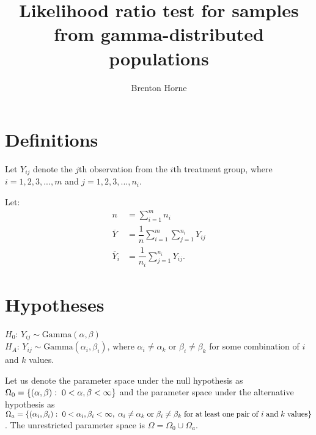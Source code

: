 \documentclass[12pt,a4paper,openright]{article}
\title{Likelihood ratio test for samples from gamma-distributed populations}
\author{Brenton Horne}
\newcommand{\GamD}{\mathrm{Gamma}}
\begin{document}
	\maketitle
	\tableofcontents
	\newpage
	
	\section{Definitions}
	Let $Y_{ij}$ denote the $j$th observation from the $i$th treatment group, where $i=1, 2, 3, ..., m$ and $j=1, 2, 3, ..., n_i$. 
	
	Let:
	\begin{align*}
		n &= \sum_{i=1}^m n_i \\
		\overline{Y} &= \dfrac{1}{n} \sum_{i=1}^m \sum_{j=1}^{n_i} Y_{ij} \\
		\overline{Y}_i &= \dfrac{1}{n_i} \sum_{j=1}^{n_i} Y_{ij}.
	\end{align*}
	
	\section{Hypotheses}
	$H_0$: $Y_{ij} \sim \GamD(\alpha, \beta)$ \\
	$H_A$: $Y_{ij} \sim \GamD(\alpha_i, \beta_i)$, where $\alpha_i \neq \alpha_k$ or $\beta_i \neq \beta_k$ for some combination of $i$ and $k$ values. 
	
	Let us denote the parameter space under the null hypothesis as $\Omega_0 = \left\{(\alpha, \beta): \hspace{0.1cm} 0 < \alpha, \beta < \infty\right\}$ and the parameter space under the alternative hypothesis as \\$\Omega_a = \left\{(\alpha_i, \beta_i): \hspace{0.1cm} 0 < \alpha_i, \beta_i < \infty,\hspace{0.1cm}\alpha_i \neq \alpha_k \hspace{0.1cm} \mathrm{or}\hspace{0.1cm}\beta_i \neq \beta_k \hspace{0.1cm}\mathrm{for}\hspace{0.1cm}\mathrm{at}\hspace{0.1cm}\mathrm{least}\hspace{0.1cm}\mathrm{one}\hspace{0.1cm}\mathrm{pair}\hspace{0.1cm}\mathrm{of}\hspace{0.1cm}i\hspace{0.1cm}\mathrm{and}\hspace{0.1cm}k \hspace{0.1cm}\mathrm{values}\right\}$. The unrestricted parameter space is $\Omega = \Omega_0 \cup \Omega_a$. 
	
\end{document}
